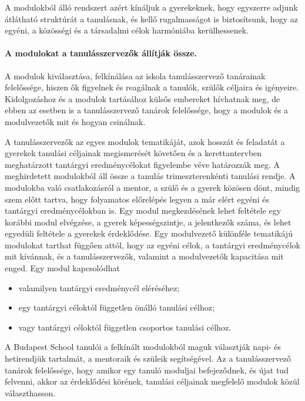 A modulokból álló rendszert azért kínáljuk a gyerekeknek, hogy egyszerre adjunk átlátható struktúrát a tanulásnak, és kellő rugalmasságot is biztosítsunk, hogy az egyéni, a közösségi és a társadalmi célok harmóniába kerülhessenek.


\paragraph{A modulokat a tanulásszervezők állítják össze.}

A modulok kiválasztása, felkínálása az iskola tanulásszervező tanárainak felelőssége, hiszen ők figyelnek és reagálnak a tanulók, szülők céljaira és igényeire. Kidolgozáshoz és a modulok tartásához külsős embereket hívhatnak meg, de ebben az esetben is a tanulásszervező tanárok felelőssége, hogy a modulok és a modulvezetők mit és hogyan csinálnak.

A tanulásszervezők az egyes modulok tematikáját, azok hosszát és feladatát a gyerekek tanulási céljainak megismerését követően és a kerettantervben meghatárzott tantárgyi eredménycélokat figyelembe véve határozzák meg. A meghirdetett modulokból áll össze a tanulás trimeszterenkénti tanulási rendje. A modulokba való csatlakozásról a mentor, a szülő és a gyerek közösen dönt, mindig szem előtt tartva, hogy folyamatos előrelépés legyen a már elért egyéni és tantárgyi eredménycélokban is. Egy modul megkezdésének lehet feltétele egy korábbi modul elvégzése, a gyerek képességszintje, a jelentkezők száma, és lehet egyedüli feltétele a gyerekek érdeklődése. Egy modulvezető különféle tematikájú modulokat tarthat függően attól, hogy az egyéni célok, a tantárgyi eredménycélok mit kívánnak, és a tanulásszervezők, valamint a modulvezetők kapacitása mit enged. Egy modul kapcsolódhat

   \begin{itemize}

\item valamilyen tantárgyi eredménycél eléréséhez;
\item egy tantárgyi céloktól független önálló tanulási célhoz;
\item vagy tantárgyi céloktól független csoportos tanulási célhoz.
\end{itemize}

A Budapest School tanulói a felkínált modulokból maguk választják napi- és hetirendjük tartalmát, a mentoraik és szüleik segítségével. Az a tanulásszervező tanárok felelőssége, hogy amikor egy tanuló moduljai befejeződnek, és újat tud felvenni, akkor az érdeklődési körének, tanulási céljainak megfelelő modulok közül választhasson.

